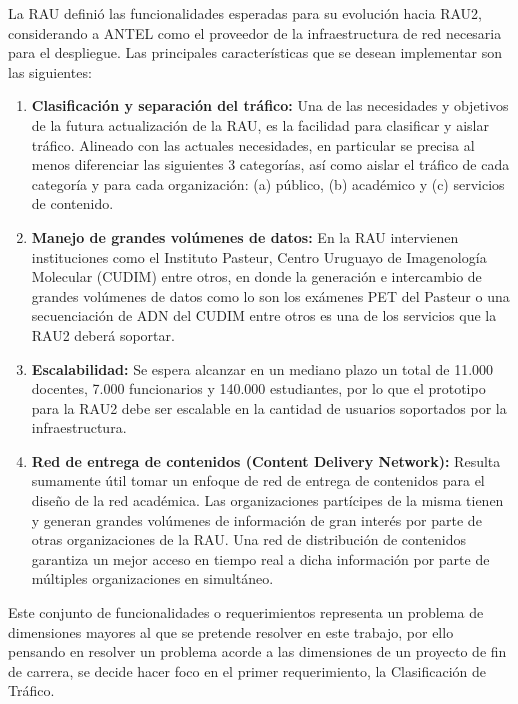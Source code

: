 La RAU definió las funcionalidades esperadas para su evolución hacia RAU2, considerando a ANTEL como el proveedor de la infraestructura de red necesaria para el despliegue. Las principales características que se desean implementar son las siguientes:


\begin{enumerate}
\item \textbf{Clasificación y separación del tráfico:} Una de las necesidades y objetivos de la futura actualizaci\'on de la RAU, es la facilidad para clasificar y aislar tráfico. Alineado con las actuales necesidades, en particular se precisa al menos diferenciar las siguientes 3 categorías, as\'i como aislar el tr\'afico de cada categoría y para cada organizaci\'on: (a) público, (b) académico y (c) servicios de contenido.

\item \textbf{Manejo de grandes volúmenes de datos:} En la RAU intervienen instituciones como el Instituto Pasteur, Centro Uruguayo de Imagenología Molecular (CUDIM) entre otros, en donde la generación e intercambio de grandes volúmenes de datos como lo son los exámenes PET del Pasteur o una secuenciación de ADN del CUDIM entre otros es una de los servicios que la RAU2 deber\'a soportar.

\item \textbf{Escalabilidad:} Se espera alcanzar en un mediano plazo un total de 11.000 docentes, 7.000 funcionarios y 140.000 estudiantes, por lo que el prototipo para la RAU2 debe ser escalable en la cantidad de usuarios soportados por la infraestructura.

\item \textbf{Red de entrega de contenidos (Content Delivery Network):} Resulta sumamente útil tomar un enfoque de red de entrega de contenidos para el diseño de la red académica. Las organizaciones partícipes de la misma tienen y generan grandes volúmenes de información de gran interés por parte de otras organizaciones de la RAU. Una red de distribución de contenidos garantiza un mejor acceso en tiempo real a dicha información por parte de múltiples organizaciones en simultáneo. 
 
\end{enumerate}

Este conjunto de funcionalidades o requerimientos representa un problema de dimensiones mayores al que se pretende resolver en este trabajo, por ello pensando en resolver un problema acorde a las dimensiones de un proyecto de fin de carrera, se decide hacer foco en el primer requerimiento, la Clasificación de Tr\'afico.

